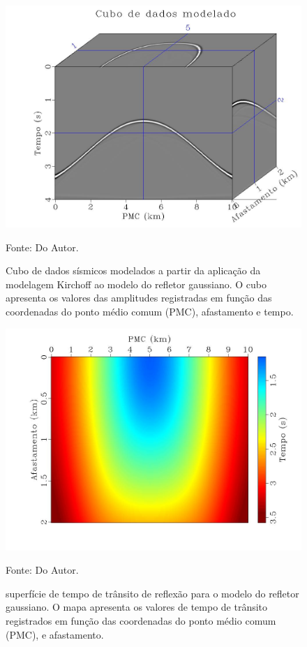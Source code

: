 \begin{figure}[htb]
\caption{Cubo de dados sísmicos modelados a partir da aplicação da modelagem Kirchoff ao modelo
do refletor gaussiano. O cubo apresenta os valores das amplitudes registradas em função das coordenadas do
ponto médio comum (PMC), afastamento e tempo.}
\begin{center}
\includegraphics[scale=0.3]{images/dataCube.jpeg}
\vspace{-0.3cm}
\end{center}
\begin{center}
 Fonte: Do Autor.
\end{center}
\label{fig:4.2}
\end{figure}

\begin{figure}[htb]
\caption{superfície de tempo de trânsito de reflexão para o modelo do refletor gaussiano.
O mapa apresenta os valores de tempo de trânsito registrados em função das coordenadas do
ponto médio comum (PMC), e afastamento.}
\begin{center}
\includegraphics[scale=0.3]{images/reflectionSurface.jpeg}
\vspace{-0.3cm}
\end{center}
\begin{center}
 Fonte: Do Autor.
\end{center}
\label{fig:4.3}
\end{figure}


